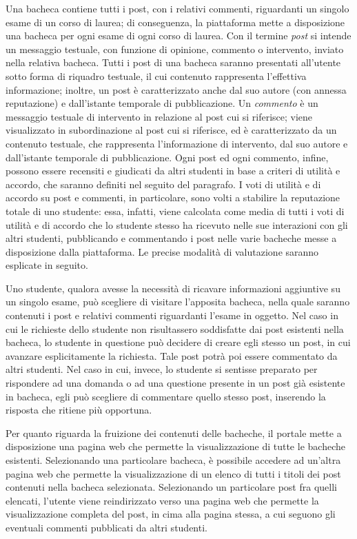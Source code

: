 \documentclass [a4paper,11pt]{book}
\begin{document}
Una bacheca contiene tutti i post, con i relativi commenti, riguardanti un singolo esame di un corso di laurea; di conseguenza, la piattaforma mette a disposizione una bacheca per ogni esame di ogni corso di laurea. Con il termine \emph{post} si intende un messaggio testuale, con funzione di opinione, commento o intervento, inviato nella relativa bacheca. Tutti i post di una bacheca saranno presentati all'utente sotto forma di riquadro testuale, il cui contenuto rappresenta l'effettiva informazione; inoltre, un post è caratterizzato anche dal suo autore (con annessa reputazione) e dall'istante temporale di pubblicazione. Un \emph{commento} è un messaggio testuale di intervento in relazione al post cui si riferisce; viene visualizzato in subordinazione al post cui si riferisce, ed è caratterizzato da un contenuto testuale, che rappresenta l'informazione di intervento, dal suo autore e dall'istante temporale di pubblicazione. Ogni post ed ogni commento, infine, possono essere recensiti e giudicati da altri studenti in base a criteri di utilità e accordo, che saranno definiti nel seguito del paragrafo. I voti di utilità e di accordo su post e commenti, in particolare, sono volti a stabilire la reputazione totale di uno studente: essa, infatti, viene calcolata come media di tutti i voti di utilità e di accordo che lo studente stesso ha ricevuto nelle sue interazioni con gli altri studenti, pubblicando e commentando i post nelle varie bacheche messe a disposizione dalla piattaforma. Le precise modalità di valutazione saranno esplicate in seguito.

Uno studente, qualora avesse la necessità di ricavare informazioni aggiuntive su un singolo esame, può scegliere di visitare l'apposita bacheca, nella quale saranno contenuti i post e relativi commenti riguardanti l'esame in oggetto. Nel caso in cui le richieste dello studente non risultassero soddisfatte dai post esistenti nella bacheca, lo studente in questione può decidere di creare egli stesso un post, in cui avanzare esplicitamente la richiesta. Tale post potrà poi essere commentato da altri studenti. Nel caso in cui, invece, lo studente si sentisse preparato per rispondere ad una domanda o ad una questione presente in un post già esistente in bacheca, egli può scegliere di commentare quello stesso post, inserendo la risposta che ritiene più opportuna.

\medskip

Per quanto riguarda la fruizione dei contenuti delle bacheche, il portale mette a disposizione una pagina web che permette la visualizzazione di tutte le bacheche esistenti. Selezionando una particolare bacheca, è possibile accedere ad un'altra pagina web che permette la visualizzazione di un elenco di tutti i titoli dei post contenuti nella bacheca selezionata. Selezionando un particolare post fra quelli elencati, l'utente viene reindirizzato verso una pagina web che permette la visualizzazione completa del post, in cima alla pagina stessa, a cui seguono gli eventuali commenti pubblicati da altri studenti. 
\end{document}
